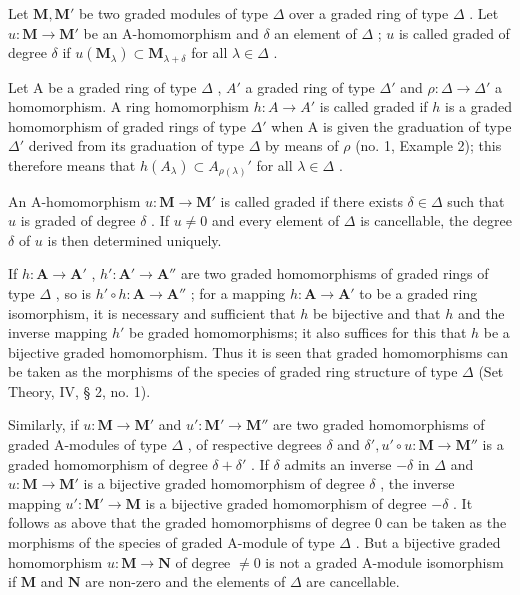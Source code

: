 Let \(\mathbf{M}, \mathbf{M}'\) be two graded modules of type \(\Delta\) over a graded ring of type \(\Delta\) . Let \(u: \mathbf{M} \to \mathbf{M}'\) be an A-homomorphism and \(\delta\) an element of \(\Delta\) ; \(u\) is called graded of degree \(\delta\) if \(u(\mathbf{M}_{\lambda}) \subset \mathbf{M}_{\lambda + \delta}\) for all \(\lambda \in \Delta\) .

Let A be a graded ring of type \(\Delta\) , \(A'\) a graded ring of type \(\Delta'\) and \(\rho: \Delta \to \Delta'\) a homomorphism. A ring homomorphism \(h: A \to A'\) is called graded if \(h\) is a graded homomorphism of graded rings of type \(\Delta'\) when A is given the graduation of type \(\Delta'\) derived from its graduation of type \(\Delta\) by means of \(\rho\) (no. 1, Example 2); this therefore means that \(h(A_{\lambda}) \subset A_{\rho(\lambda)}'\) for all \(\lambda \in \Delta\) .

An A-homomorphism \(u: \mathbf{M} \to \mathbf{M}'\) is called graded if there exists \(\delta \in \Delta\) such that \(u\) is graded of degree \(\delta\) . If \(u \neq 0\) and every element of \(\Delta\) is cancellable, the degree \(\delta\) of \(u\) is then determined uniquely.

If \(h: \mathbf{A} \to \mathbf{A}'\) , \(h': \mathbf{A}' \to \mathbf{A}''\) are two graded homomorphisms of graded rings of type \(\Delta\) , so is \(h' \circ h: \mathbf{A} \to \mathbf{A}''\) ; for a mapping \(h: \mathbf{A} \to \mathbf{A}'\) to be a graded ring isomorphism, it is necessary and sufficient that \(h\) be bijective and that \(h\) and the inverse mapping \(h'\) be graded homomorphisms; it also suffices for this that \(h\) be a bijective graded homomorphism. Thus it is seen that graded homomorphisms can be taken as the morphisms of the species of graded ring structure of type \(\Delta\) (Set Theory, IV, § 2, no. 1).

Similarly, if \(u: \mathbf{M} \to \mathbf{M}'\) and \(u': \mathbf{M}' \to \mathbf{M}''\) are two graded homomorphisms of graded A-modules of type \(\Delta\) , of respective degrees \(\delta\) and \(\delta', u' \circ u: \mathbf{M} \to \mathbf{M}''\) is a graded homomorphism of degree \(\delta + \delta'\) . If \(\delta\) admits an inverse \(-\delta\) in \(\Delta\) and \(u: \mathbf{M} \to \mathbf{M}'\) is a bijective graded homomorphism of degree \(\delta\) , the inverse mapping \(u': \mathbf{M}' \to \mathbf{M}\) is a bijective graded homomorphism of degree \(-\delta\) . It follows as above that the graded homomorphisms of degree 0 can be taken as the morphisms of the species of graded A-module of type \(\Delta\) . But a bijective graded homomorphism \(u: \mathbf{M} \to \mathbf{N}\) of degree \(\neq 0\) is not a graded A-module isomorphism if \(\mathbf{M}\) and \(\mathbf{N}\) are non-zero and the elements of \(\Delta\) are cancellable.

